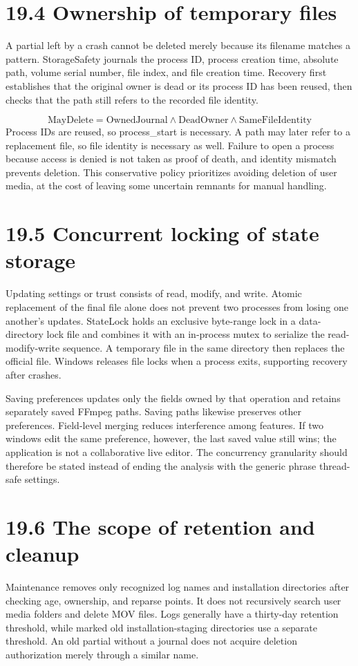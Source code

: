 \documentclass[11pt,a4paper,openany]{book}
\begin{document}
\section*{19.4 Ownership of temporary files}
A partial left by a crash cannot be deleted merely because its filename matches a pattern. StorageSafety journals the process ID, process creation time, absolute path, volume serial number, file index, and file creation time. Recovery first establishes that the original owner is dead or its process ID has been reused, then checks that the path still refers to the recorded file identity.


\begin{equation}
\mathrm{MayDelete}=\mathrm{OwnedJournal}\land\mathrm{DeadOwner}\land\mathrm{SameFileIdentity}
\end{equation}
Process IDs are reused, so process\_start is necessary. A path may later refer to a replacement file, so file identity is necessary as well. Failure to open a process because access is denied is not taken as proof of death, and identity mismatch prevents deletion. This conservative policy prioritizes avoiding deletion of user media, at the cost of leaving some uncertain remnants for manual handling.


\section*{19.5 Concurrent locking of state storage}
Updating settings or trust consists of read, modify, and write. Atomic replacement of the final file alone does not prevent two processes from losing one another's updates. StateLock holds an exclusive byte-range lock in a data-directory lock file and combines it with an in-process mutex to serialize the read-modify-write sequence. A temporary file in the same directory then replaces the official file. Windows releases file locks when a process exits, supporting recovery after crashes.

Saving preferences updates only the fields owned by that operation and retains separately saved FFmpeg paths. Saving paths likewise preserves other preferences. Field-level merging reduces interference among features. If two windows edit the same preference, however, the last saved value still wins; the application is not a collaborative live editor. The concurrency granularity should therefore be stated instead of ending the analysis with the generic phrase thread-safe settings.


\section*{19.6 The scope of retention and cleanup}
Maintenance removes only recognized log names and installation directories after checking age, ownership, and reparse points. It does not recursively search user media folders and delete MOV files. Logs generally have a thirty-day retention threshold, while marked old installation-staging directories use a separate threshold. An old partial without a journal does not acquire deletion authorization merely through a similar name.
\end{document}
